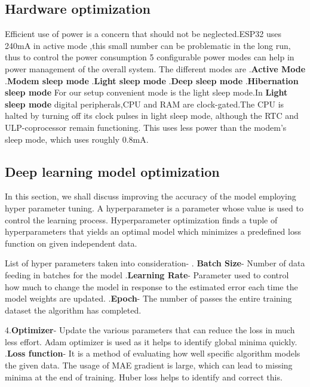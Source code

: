 \documentclass[12 pt]{report}
\begin{document}
\subsection{Hardware optimization}
Efficient use of power is a concern that should not be neglected.ESP32 uses 240mA in active mode ,this small number can be problematic in the long run, thus to control the power consumption 5 configurable power modes can help in power management of the overall system. The different modes are
.\textbf{Active Mode}
.\textbf{Modem sleep mode}
.\textbf{Light sleep mode}
.\textbf{Deep sleep mode}
.\textbf{Hibernation sleep mode}
\newline
For our setup  convenient  mode is the light sleep mode.In \textbf{Light sleep mode} digital peripherals,CPU and RAM are clock-gated.The CPU is halted by turning off its clock pulses in light sleep mode, although the RTC and ULP-coprocessor remain functioning. This uses less power than the modem's sleep mode, which uses roughly 0.8mA. 

\subsection{Deep learning model optimization}
In this section, we shall discuss improving the accuracy of the model employing hyper parameter tuning.  A hyperparameter is a parameter whose value is used to control the learning process.  Hyperparameter optimization finds a tuple of hyperparameters that yields an optimal model which minimizes a predefined loss function on given independent data.
\newline

List of hyper parameters taken into consideration-
.\textbf{ Batch Size}- Number of data feeding in batches for the model
.\textbf{Learning Rate}- Parameter used to control how much to change the model in response to the estimated error each time the model weights are updated.
.\textbf{Epoch}- The number of passes the entire training dataset the algorithm has completed.

4.\textbf{Optimizer}- Update the various parameters that can reduce the loss in much less effort. Adam optimizer is used as it helps to identify global minima quickly.
.\textbf{Loss function}-  It is a method of evaluating how well specific algorithm models the given data. The usage of MAE gradient is large, which can lead to missing minima at the end of training. Huber loss helps to identify and correct this.
\newline
\end{document}
